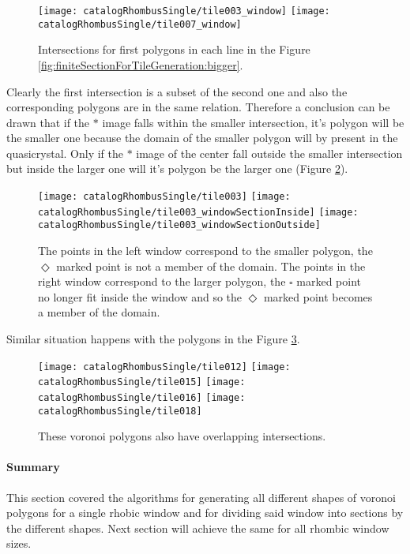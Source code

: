 \documentclass[text.tex]{subfiles}
\begin{document}
\begin{figure}[h]
\centering
\texttt{[image: catalogRhombusSingle/tile003\_window]}
\texttt{[image: catalogRhombusSingle/tile007\_window]}
\caption{Intersections for first polygons in each line in the Figure \ref{fig:finiteSectionForTileGeneration:bigger}.}
\label{fig:intersectionsComparison}
\end{figure}

Clearly the first intersection is a subset of the second one and also the corresponding polygons are in the same relation. Therefore a conclusion can be drawn that if the $\ast$ image falls within the smaller intersection, it's polygon will be the smaller one because the domain of the smaller polygon will by present in the quasicrystal. Only if the $\ast$ image of the center fall outside the smaller intersection but inside the larger one will it's polygon be the larger one (Figure \ref{fig:intersectionOverlap}).

\begin{figure}[h]
\centering
\texttt{[image: catalogRhombusSingle/tile003]}
\texttt{[image: catalogRhombusSingle/tile003\_windowSectionInside]}
\texttt{[image: catalogRhombusSingle/tile003\_windowSectionOutside]}
\caption{The points in the left window correspond to the smaller polygon, the {\scriptsize $\Diamond$} marked point is not a member of the domain. The points in the right window correspond to the larger polygon, the {\scriptsize $\square$} marked point no longer fit inside the window and so the {\scriptsize $\Diamond$} marked point becomes a member of the domain.}
\label{fig:intersectionOverlap}
\end{figure}

Similar situation happens with the polygons in the Figure \ref{fig:morePolygonsExample}.

\begin{figure}[h]
\centering
\texttt{[image: catalogRhombusSingle/tile012]}
\texttt{[image: catalogRhombusSingle/tile015]}
\texttt{[image: catalogRhombusSingle/tile016]}
\texttt{[image: catalogRhombusSingle/tile018]}
\caption{These voronoi polygons also have overlapping intersections.}
\label{fig:morePolygonsExample}
\end{figure}

\paragraph{Summary}
This section covered the algorithms for generating all different shapes of voronoi polygons for a single rhobic window and for dividing said window into sections by the different shapes. Next section will achieve the same for all rhombic window sizes.
\end{document}
